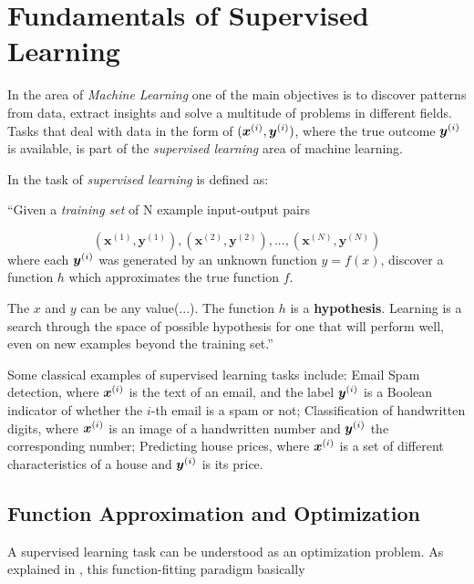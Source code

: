 \chapter{Fundamentals of Supervised Learning}
\label{cap:ml-fundamentals}

In the area of \textit{Machine Learning} one of the main objectives is to discover patterns from data, extract insights and solve a multitude of problems in different fields. Tasks that deal with data in the form of $(\bm{x}^{(i)},\bm{y}^{(i)})$, where the true outcome $\bm{y}^{(i)}$ is available, is part of the \textit{supervised learning} area of machine learning.

In \cite{aima:2010} the task of \textit{supervised learning} is defined as:

\begin{displayquote}
``Given a \textit{training set} of N example input-output pairs

$$(\bm{x}^{(1)},\bm{y}^{(1)}), (\bm{x}^{(2)},\bm{y}^{(2)}), ..., (\bm{x}^{(N)},\bm{y}^{(N)})$$
where each $\bm{y}^{(i)}$ was generated by an unknown function $y = f(x)$, discover a function $h$ which approximates the true function $f$.

The $x$ and $y$ can be any value(...). The function $h$ is a \textbf{hypothesis}. Learning is a search through the space of possible hypothesis for one that will perform well, even on new examples beyond the training set.''
\end{displayquote}

Some classical examples of supervised learning tasks include: Email Spam detection, where $\bm{x}^{(i)}$ is the text of an email, and the label $\bm{y}^{(i)}$ is a Boolean indicator of whether the $i$-th email is a spam or not; Classification of handwritten digits, where $\bm{x}^{(i)}$ is an image of a handwritten number and $\bm{y}^{(i)}$ the corresponding number; Predicting house prices, where $\bm{x}^{(i)}$ is a set of different characteristics of a house and $\bm{y}^{(i)}$ is its price.

\section{Function Approximation and Optimization}

A supervised learning task can be understood as an optimization problem. As explained in \cite{hastie2009elements}, this function-fitting paradigm basically


